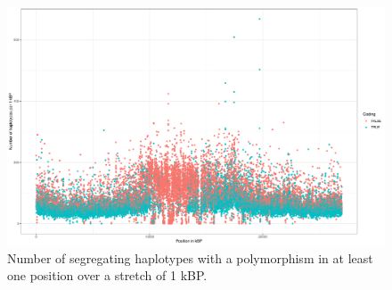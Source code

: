 \begin{figure}[th]
\centering
\includegraphics[height=.55\textheight, width=1.1\textwidth]{Figures/chr5_hap}
\decoRule
\caption[Haplotype strutcture of chromosome 5 of \textit{A. thaliana}]{Number of segregating haplotypes with a polymorphism in at least one position over a stretch of 1 kBP. }
\label{fig:chr5}
\end{figure}



